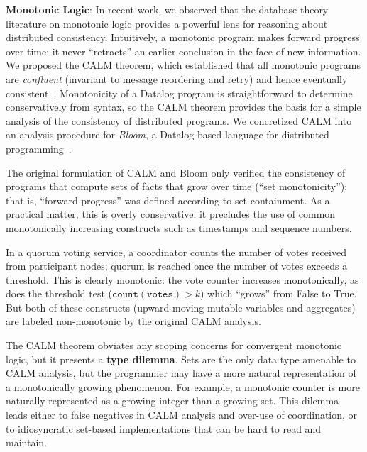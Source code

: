 
\vspace{0.5em} \noindent
\textbf{Monotonic Logic}: In recent work, we observed that the database theory
literature on monotonic logic provides a powerful lens for reasoning about
distributed consistency. Intuitively, a monotonic program makes forward progress
over time: it never ``retracts'' an earlier conclusion in the face of new
information. We proposed the CALM theorem, which established that all monotonic
programs are \emph{confluent} (invariant to message reordering and retry) and
hence eventually
consistent~\cite{Ameloot2011,Hellerstein2010,dedalus-confluence}. Monotonicity
of a Datalog program is straightforward to determine conservatively from syntax,
so the CALM theorem provides the basis for a simple analysis of the consistency of distributed programs. We concretized CALM into an
analysis procedure for \emph{Bloom}, a Datalog-based language for distributed
programming~\cite{Alvaro2011,bloom}.

The original formulation of CALM and Bloom only verified the consistency of
programs that compute sets of facts that grow over time (``set monotonicity'');
that is, ``forward progress'' was defined according to set containment. As a
practical matter, this is overly conservative: it precludes the use of common
monotonically increasing constructs such as timestamps and sequence numbers.

\vspace{-0.25em}
\begin{example}
  In a quorum voting service, a coordinator counts the number of votes received
  from participant nodes; quorum is reached once the number of votes exceeds a
  threshold. This is clearly monotonic: the vote counter increases
  monotonically, as does the threshold test ($\mathtt{count(votes)} > k$) which
  ``grows'' from False to True. But both of these constructs (upward-moving
  mutable variables and aggregates) are labeled non-monotonic by the original
  CALM analysis.
\end{example}

\vspace{-.25em}
The CALM theorem obviates any scoping concerns for convergent monotonic logic, but it presents a \textbf{type dilemma}. Sets are the only data type amenable to CALM analysis, but the programmer may have a more natural representation of a monotonically growing phenomenon. For example, a monotonic counter is more naturally represented as a growing integer than a growing set. This dilemma leads either to false negatives in CALM analysis and over-use of coordination, or to idiosyncratic set-based implementations that can be hard to read and maintain.


